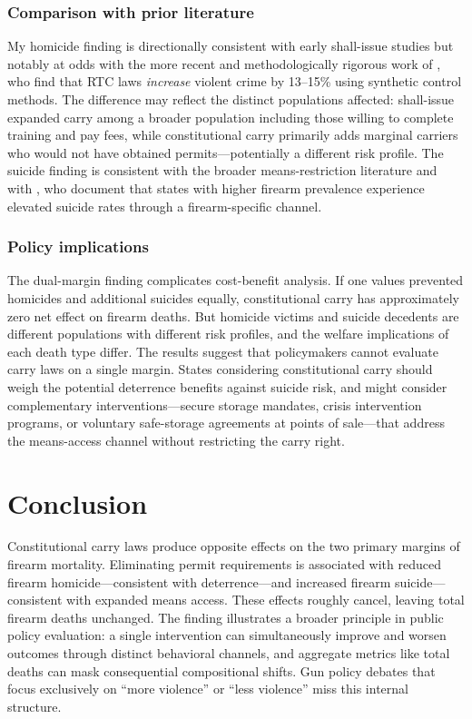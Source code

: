 \documentclass[12pt]{article}
\begin{document}
\subsubsection*{Comparison with prior literature} My homicide finding is directionally consistent with early shall-issue studies \citep{lottmustard1997} but notably at odds with the more recent and methodologically rigorous work of \citet{donohue2019}, who find that RTC laws \textit{increase} violent crime by 13--15\% using synthetic control methods. The difference may reflect the distinct populations affected: shall-issue expanded carry among a broader population including those willing to complete training and pay fees, while constitutional carry primarily adds marginal carriers who would not have obtained permits---potentially a different risk profile. The suicide finding is consistent with the broader means-restriction literature \citep{ludwigcook2000, miller2007} and with \citet{edwards2024}, who document that states with higher firearm prevalence experience elevated suicide rates through a firearm-specific channel.

\subsubsection*{Policy implications} The dual-margin finding complicates cost-benefit analysis. If one values prevented homicides and additional suicides equally, constitutional carry has approximately zero net effect on firearm deaths. But homicide victims and suicide decedents are different populations with different risk profiles, and the welfare implications of each death type differ. The results suggest that policymakers cannot evaluate carry laws on a single margin. States considering constitutional carry should weigh the potential deterrence benefits against suicide risk, and might consider complementary interventions---secure storage mandates, crisis intervention programs, or voluntary safe-storage agreements at points of sale---that address the means-access channel without restricting the carry right.

\section{Conclusion}
\label{sec:conclusion}

Constitutional carry laws produce opposite effects on the two primary margins of firearm mortality. Eliminating permit requirements is associated with reduced firearm homicide---consistent with deterrence---and increased firearm suicide---consistent with expanded means access. These effects roughly cancel, leaving total firearm deaths unchanged. The finding illustrates a broader principle in public policy evaluation: a single intervention can simultaneously improve and worsen outcomes through distinct behavioral channels, and aggregate metrics like total deaths can mask consequential compositional shifts. Gun policy debates that focus exclusively on ``more violence'' or ``less violence'' miss this internal structure.
\end{document}
